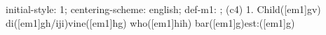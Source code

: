 initial-style: 1;
centering-scheme: english;
def-m1: \grealign;
(c4) 1. Child([em1]gv) di([em1]gh/iji)vine([em1]hg) who([em1]hih) bar([em1]g)est:([em1]g)